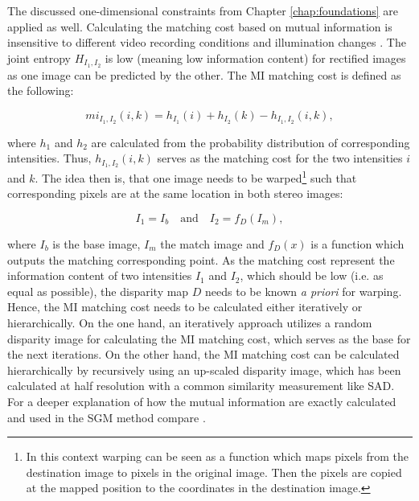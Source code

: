 \noindent The discussed one-dimensional constraints from Chapter \ref{chap:foundations} are applied as well.
Calculating the matching cost based on mutual information is insensitive to different video recording conditions and illumination changes \citep{hirschmuller2005accurate, viola1997alignment}.
The joint entropy $H_{I_1,I_2}$ is low (meaning low information content) for rectified images as one image can be predicted by the other.
The MI matching cost is defined as the following:

\begin{equation}
  mi_{I_1,I_2}(i,k) = h_{I_1}(i) + h_{I_2}(k) - h_{I_1,I_2}(i,k),
\end{equation}

\noindent where $h_1$ and $h_2$ are calculated from the probability distribution of corresponding intensities.
Thus, $h_{I_1,I_2}(i,k)$ serves as the matching cost for the two intensities $i$ and $k$.
The idea then is, that one image needs to be warped\footnote{In this context warping can be seen as a function which maps pixels from the destination image to pixels in the original image. Then the pixels are copied at the mapped position to the coordinates in the destination image.} such that corresponding pixels are at the same location in both stereo images:

\begin{equation}
    I_1 = I_b\quad \textrm{and}\quad I_2 = f_D(I_m),
\end{equation}

\noindent where $I_b$ is the base image, $I_m$ the match image and $f_D(x)$ is a function which outputs the matching corresponding point.
As the matching cost represent the information content of two intensities $I_1$ and $I_2$, which should be low (i.e. as equal as possible), the disparity map $D$ needs to be known \textit{a priori} for warping.
Hence, the MI matching cost needs to be calculated either iteratively or hierarchically.
On the one hand, an iteratively approach utilizes a random disparity image for calculating the MI matching cost, which serves as the base for the next iterations.
On the other hand, the MI matching cost can be calculated hierarchically by recursively using an up-scaled disparity image, which has been calculated at half resolution with a common similarity measurement like SAD.
For a deeper explanation of how the mutual information are exactly calculated and used in the SGM method compare \citep{hirschmuller2005accurate, hirschmuller2007evaluation, hirschmuller2008stereo, hirschmuller2011semi}.

